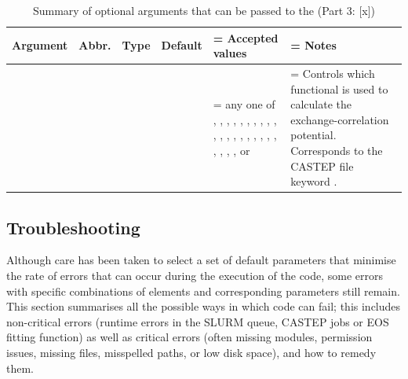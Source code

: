 \clearpage

\begin{table}[!h]
\centering
\begin{tabularx}{1\linewidth}{|c|c|c|c|>{\hsize\linewidth=\hsize}Y|>{\hsize\linewidth=\hsize}Y|}
\hline
\textbf{Argument} & \textbf{Abbr.} & \textbf{Type} & \textbf{Default} & \textbf{Accepted values} & \textbf{Notes} \\ \hline

 &  &  &  & any one of , , , , , , , , , , , , , , , , , , , , , , , ,  or  & Controls which functional is used to calculate the exchange-correlation potential. Corresponds to the CASTEP  file keyword . \\ \hline

\end{tabularx}
\caption{Summary of optional arguments that can be passed to the  (Part 3: [x])}
\label{tab:arguments3}
\end{table}

\subsection{Troubleshooting}

Although care has been taken to select a set of default parameters that minimise the rate of errors that can occur during the execution of the code, some errors with specific combinations of elements and corresponding parameters still remain. This section summarises all the possible ways in which code can fail; this includes non-critical errors (runtime errors in the SLURM queue, CASTEP jobs or EOS fitting function) as well as critical errors (often missing modules, permission issues, missing files, misspelled paths, or low disk space), and how to remedy them.

